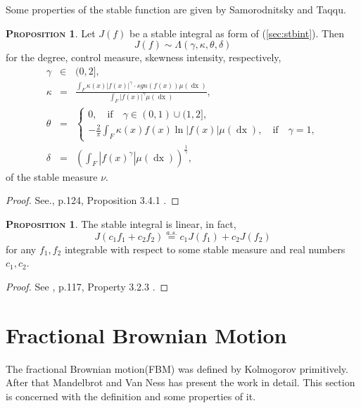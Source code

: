\documentclass[a4paper, twoside, 11pt]{article}
\theoremstyle{definition}
\newtheorem{proposition}[definition]{\scshape Proposition}
\newcommand{\brkt}[1]{\left({#1} \right)}
\begin{document}
Some properties of the stable function are given by Samorodnitsky and Taqqu.

\begin{proposition}
  Let $J(f)$ be a stable integral as form of (\ref{sec:stbint}). Then 
  \begin{equation*}
	J(f) \sim \Lambda(\gamma, \kappa, \theta, \delta)
  \end{equation*}
for the degree, control measure, skewness intensity, respectively, 
\begin{eqnarray*}
\gamma &\in& (0, 2],\\
\kappa &=& \frac{\int_F \kappa(x) |f(x)|^\gamma\cdot sgn(f(x)) \mu(\mathop{dx})}{\int_F|f(x)|^\gamma\mu(\mathop{dx})},\\
\theta &=&
\begin{cases}
0 , \hspace{1em} \text{if} \hspace{1em} \gamma \in (0, 1) \cup (1, 2],\\
  -\frac{2}{\pi}\int_F \kappa(x) f(x) \ln|f(x)|\mu(\mathop{dx}), \hspace{1em} \text{if} \hspace{1em} \gamma = 1,
\end{cases}\\
\delta &=& \brkt{\int_F |f(x)^\gamma|\mu(\mathop{dx})}^{\frac{1}{\gamma}}, 
\end{eqnarray*}
of the stable measure $\nu$.
\label{sec:stbint2}
\end{proposition}
\begin{proof}
  See.\cite{samorodnitsky}, p.124, Proposition 3.4.1 .
\end{proof}
\begin{proposition}
  The stable integral is linear, in fact,
\begin{equation}
  J(c_1f_1 + c_2f_2) \overset{a.s.}{=}c_1J(f_1) + c_2J(f_2)
  \label{sec:stblin}
\end{equation}
for any $f_1, f_2$ integrable with respect to some stable measure and real numbers $c_1, c_2$. 
\end{proposition}
\begin{proof}
  See \cite{samorodnitsky}, p.117, Property 3.2.3 .
\end{proof}
\newpage
\section{Fractional Brownian Motion}
\setcounter{equation}{0}
The fractional Brownian motion(FBM) was defined by Kolmogorov primitively. After that Mandelbrot and Van Ness has present the work in detail. This section is concerned with the definition and some properties of it.
\end{document}
